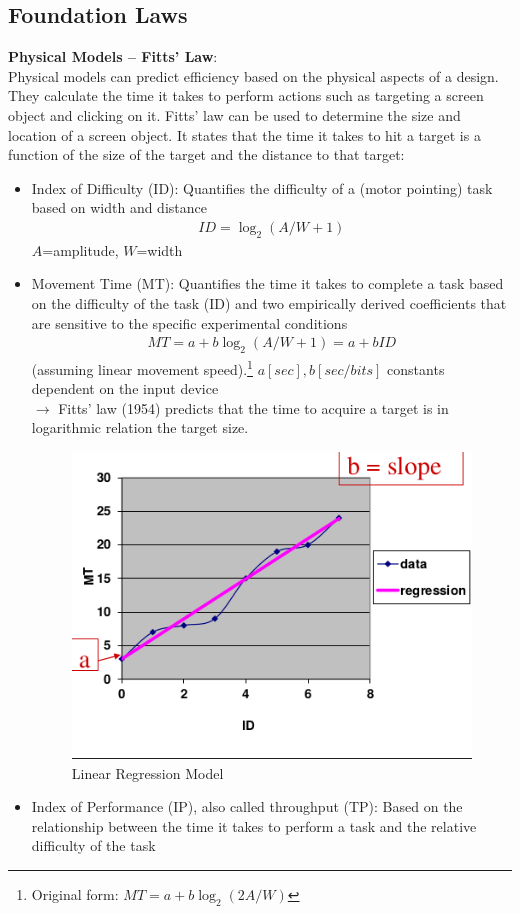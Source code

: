 \subsection{Foundation Laws}
\textbf{Physical Models -- Fitts' Law}:\\
Physical models can predict efficiency based on the physical aspects of a design. They calculate the time it takes to perform actions such as targeting a screen object and clicking on it.
Fitts' law can be used to determine the size and location of a screen object. It states that the time it takes to hit a target is a function of the size of the target and the distance to that target:

\begin{itemize}
\item Index of Difficulty (ID): Quantifies the difficulty of a (motor pointing) task based on width and distance
\begin{align*}
ID = \log_2(A / W+1)
\end{align*}
$A$=amplitude, $W$=width
\item Movement Time (MT): Quantifies the time it takes to complete a task based on the difficulty of the task (ID) and two empirically derived coefficients that are sensitive to the specific experimental conditions\\
\begin{align*}
MT = a + b \log_2(A / W+1) = a + b ID
\end{align*}(assuming linear movement speed).\footnote{Original form: $MT = a + b \log_2(2A / W)$}
$a \left[sec\right], b\left[sec/bits\right]$ constants dependent on the input device\\
$\rightarrow$ Fitts' law (1954) predicts that the time to acquire a target is in logarithmic relation the target size.\\
\begin{figure}[h!]
	\centering
	\includegraphics[width=.5\textwidth]{img/ch05_fitt.png}
	\caption{Linear Regression Model}
	\label{fitt}
\end{figure} 
\item Index of Performance (IP), also called throughput (TP): Based on the relationship between the time it takes to perform a task and the relative difficulty of the task
\end{itemize}

